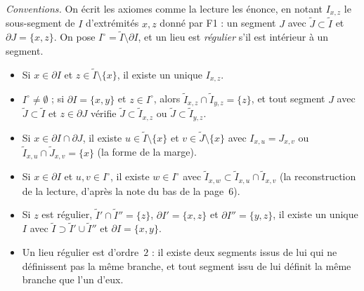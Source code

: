 \noindent\emph{Conventions.} On écrit les axiomes comme la lecture les énonce, en notant $I_{x,z}$ le sous-segment de $I$ d'extrémités $x, z$ donné par F1 : un segment $J$ avec $\widetilde J \subset \widetilde I$ et $\partial J = \{x,z\}$. On pose $I^\circ = \widetilde I \setminus \partial I$, et un lieu est \emph{régulier} s'il est intérieur à un segment.
\begin{itemize}
\item[F1] Si $x \in \partial I$ et $z \in \widetilde I \setminus \{x\}$, il existe un unique $I_{x,z}$.
\item[F2] $I^\circ \neq \emptyset$ ; si $\partial I = \{x,y\}$ et $z \in I^\circ$, alors $\widetilde I_{x,z} \cap \widetilde I_{y,z} = \{z\}$, et tout segment $J$ avec $\widetilde J \subset \widetilde I$ et $z \in \partial J$ vérifie $\widetilde J \subset \widetilde I_{x,z}$ ou $\widetilde J \subset \widetilde I_{y,z}$.
\item[F3] Si $x \in \partial I \cap \partial J$, il existe $u \in \widetilde I \setminus \{x\}$ et $v \in \widetilde J \setminus \{x\}$ avec $I_{x,u} = J_{x,v}$ ou $\widetilde I_{x,u} \cap \widetilde J_{x,v} = \{x\}$ (la forme de la marge).
\item[F$'$3] Si $x \in \partial I$ et $u, v \in I^\circ$, il existe $w \in I^\circ$ avec $\widetilde I_{x,w} \subset \widetilde I_{x,u} \cap \widetilde I_{x,v}$ (la reconstruction de la lecture, d'après la note du bas de la page~6).
\item[F4] Si $z$ est régulier, $\widetilde I' \cap \widetilde I'' = \{z\}$, $\partial I' = \{x,z\}$ et $\partial I'' = \{y,z\}$, il existe un unique $I$ avec $\widetilde I \supset \widetilde I' \cup \widetilde I''$ et $\partial I = \{x,y\}$.
\item[F5] Un lieu régulier est d'ordre~$2$ : il existe deux segments issus de lui qui ne définissent pas la même branche, et tout segment issu de lui définit la même branche que l'un d'eux.
\end{itemize}

